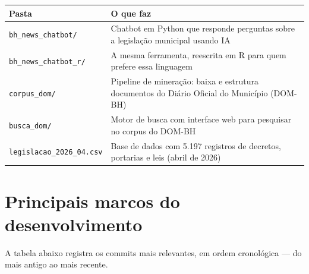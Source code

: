 \documentclass[12pt,a4paper]{article}
\begin{document}
\begin{tabularx}{\linewidth}{lX}
  \toprule
  \textbf{Pasta} & \textbf{O que faz} \\
  \midrule
  \texttt{bh\_news\_chatbot/}    & Chatbot em Python que responde perguntas sobre a legislação municipal usando IA \\
  \texttt{bh\_news\_chatbot\_r/} & A mesma ferramenta, reescrita em R para quem prefere essa linguagem \\
  \texttt{corpus\_dom/}          & Pipeline de mineração: baixa e estrutura documentos do Diário Oficial do Município (DOM-BH) \\
  \texttt{busca\_dom/}           & Motor de busca com interface web para pesquisar no corpus do DOM-BH \\
  \texttt{legislacao\_2026\_04.csv} & Base de dados com 5.197 registros de decretos, portarias e leis (abril de 2026) \\
  \bottomrule
\end{tabularx}

\section{Principais marcos do desenvolvimento}

A tabela abaixo registra os commits mais relevantes, em ordem cronológica --- do mais antigo ao mais recente.
\end{document}
